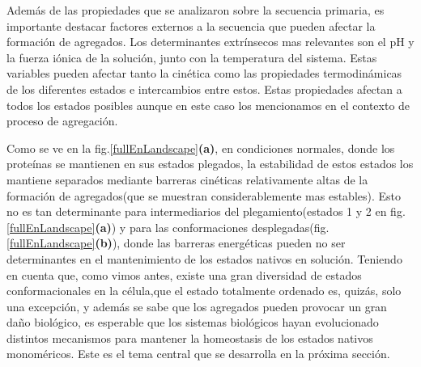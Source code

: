 Además de las propiedades que se analizaron sobre la secuencia primaria, es importante destacar factores externos a la secuencia que pueden afectar la formación de agregados.
Los determinantes extrínsecos mas relevantes son el pH y la fuerza iónica de la solución, junto con la temperatura del sistema.
Estas variables pueden afectar tanto la cinética como las propiedades termodinámicas de los diferentes estados e intercambios entre estos.
Estas propiedades afectan a todos los estados posibles aunque en este caso los mencionamos en el contexto de proceso de agregación.



Como se ve en la fig.\ref{fullEnLandscape}\textbf{(a)}, en condiciones normales, donde los proteínas se mantienen en sus estados plegados, 
la estabilidad de estos estados los mantiene separados mediante barreras cinéticas relativamente altas de la formación de agregados(que se muestran considerablemente mas estables).
Esto no es tan determinante para intermediarios del plegamiento(estados 1 y 2 en fig. \ref{fullEnLandscape}\textbf{(a)}) y para las conformaciones desplegadas(fig. \ref{fullEnLandscape}\textbf{(b)}), 
donde las barreras energéticas pueden no ser determinantes en el mantenimiento de los estados nativos en solución.
Teniendo en cuenta que, como vimos antes, existe una gran diversidad de estados conformacionales en la célula,que el estado totalmente ordenado es, quizás, solo una excepción, y además se sabe que los agregados pueden provocar un gran daño biológico,
es esperable que los sistemas biológicos hayan evolucionado distintos mecanismos para mantener la homeostasis de los estados nativos monoméricos.
Este es el tema central que se desarrolla en la próxima sección.








